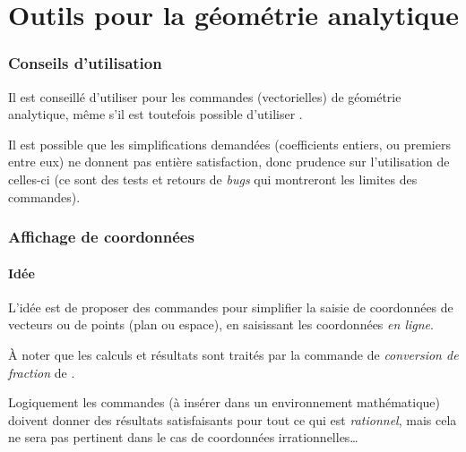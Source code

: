 \part{Outils pour la géométrie analytique}

\section{Conseils d'utilisation}

\begin{warningblock}
 Il est conseillé d'utiliser  pour les commandes (vectorielles) de géométrie analytique, même s'il est toutefois possible d'utiliser .

\smallskip

Il est possible que les simplifications demandées (coefficients entiers, ou premiers entre eux) ne donnent pas entière satisfaction, donc prudence sur l'utilisation de celles-ci (ce sont des tests et retours de \textit{bugs} qui montreront les limites des commandes).
\end{warningblock}

\section{Affichage de coordonnées}\label{affcoord}

\subsection{Idée}

\begin{tipblock}
 L'idée est de proposer des commandes pour simplifier la saisie de coordonnées de vecteurs ou de points (plan ou espace), en saisissant les coordonnées \textit{en ligne}.

\smallskip

À noter que les calculs et résultats sont traités par la commande de \textit{conversion de fraction} de .
\end{tipblock}

\begin{warningblock}
Logiquement les commandes (à insérer dans un environnement mathématique) doivent donner des résultats satisfaisants pour tout ce qui est \textit{rationnel}, mais cela ne sera pas pertinent dans le cas de coordonnées irrationnelles\ldots
\end{warningblock}

